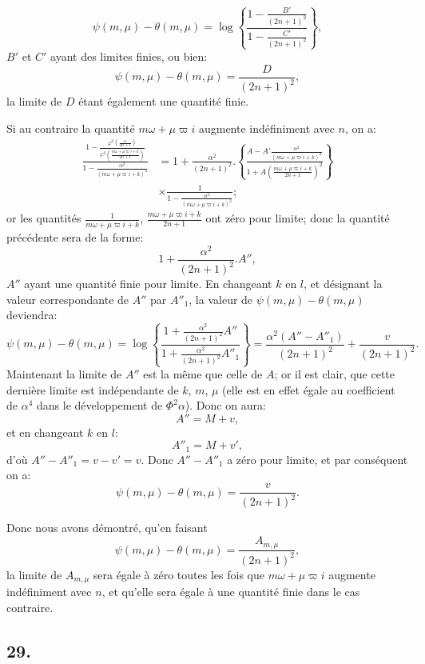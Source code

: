 \documentclass{article}
\begin{document}
\[ \psi(m,\mu)-\theta(m,\mu)=\log\left\{\frac{1-\frac{B'}{(2n+1)^{2}}}{1-\frac{C'}{(2n+1)^{2}}}\right\}, \]
$B'$ et $C'$ ayant des limites finies, ou bien:
\[ \psi(m,\mu)-\theta(m,\mu)=\frac{D}{(2n+1)^{2}}, \]
la limite de $D$ étant également une quantité finie.

Si au contraire la quantité $m\omega+\mu\varpi i$ augmente indéfiniment avec $n$, on a:
\[ \begin{aligned}\frac{1-\frac{\varphi^{2}\left(\frac{\alpha}{2n+1}\right)}{\varphi^{2}\left(\frac{m\omega+\mu\varpi i+k}{2n+1}\right)}}{1-\frac{\alpha^{2}}{(m\omega+\mu\varpi i+k)^{2}}}&=1+\frac{\alpha^{2}}{(2n+1)^{2}}.\left\{\frac{A-A'\frac{\alpha^{2}}{(m\omega+\mu\varpi i+k)^{2}}}{1+A\left(\frac{m\omega+\mu\varpi i+k}{2n+1}\right)^{2}}\right\}\\ &\times\frac{1}{1-\frac{\alpha^{2}}{(m\omega+\mu\varpi i+k)^{2}}};\end{aligned} \]
or les quantités $\frac{1}{m\omega+\mu\varpi i+k}$, $\frac{m\omega+\mu\varpi i+k}{2n+1}$ ont zéro pour limite; donc la quantité précédente sera de la forme:
\[ 1+\frac{\alpha^{2}}{(2n+1)^{2}}.A'', \]
$A''$ ayant une quantité finie pour limite. En changeant $k$ en $l$, et désignant la valeur correspondante de $A''$ par $A''_{1}$, la valeur de $\psi(m,\mu)-\theta(m,\mu)$ deviendra:
\[ \psi(m,\mu)-\theta(m,\mu)=\log\left\{\frac{1+\frac{\alpha^{2}}{(2n+1)^{2}}A''}{1+\frac{\alpha^{2}}{(2n+1)^{2}}A''_{1}}\right\}=\frac{\alpha^{2}(A''-A''_{1})}{(2n+1)^{2}}+\frac{v}{(2n+1)^{2}}. \]
Maintenant la limite de $A''$ est la même que celle de $A$; or il est clair, que cette dernière limite est indépendante de $k$, $m$, $\mu$ (elle est en effet égale au coefficient de $\alpha^{4}$ dans le développement de $\Phi^{2}\alpha$). Donc on aura:
\[ A''=M+v, \]
et en changeant $k$ en $l$:
\[ A''_{1}=M+v', \]
d'où $A''-A''_{1}=v-v'=v$. Donc $A''-A''_{1}$ a zéro pour limite, et par conséquent on a:
\[ \psi(m,\mu)-\theta(m,\mu)=\frac{v}{(2n+1)^{2}}. \]


Donc nous avons démontré, qu'en faisant
\[ \psi(m,\mu)-\theta(m,\mu)=\frac{A_{m,\mu}}{(2n+1)^{2}}, \tag{167.} \]
la limite de $A_{m,\mu}$ sera égale à zéro toutes les fois que $m\omega+\mu\varpi i$ augmente indéfiniment avec $n$, et qu'elle sera égale à une quantité finie dans le cas contraire.

\subsection*{29.}
\end{document}
